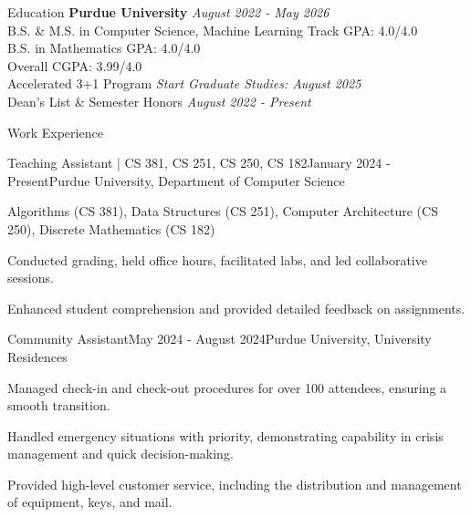 \documentclass[
    11pt, %
]{resume} %
\begin{document}
\small
\vspace*{-0.3cm}
\begin{rSection}{Education}
\vspace*{-0.3cm}
    \textbf{Purdue University} \hfill \textit{August 2022 - May 2026} \\
    B.S. \& M.S. in Computer Science, Machine Learning Track \hfill GPA: 4.0/4.0 \\
    B.S. in Mathematics \hfill GPA: 4.0/4.0 \\
    \hspace*{\fill}  Overall CGPA: 3.99/4.0 \\
    Accelerated 3+1 Program \hfill {\em Start Graduate Studies: August 2025} \\
    Dean's List \& Semester Honors \hfill {\em August 2022 - Present}

\end{rSection}

\vspace*{-0.3cm}
\begin{rSection}{Work Experience}
\vspace*{-0.2cm}
    \begin{rSubsection}{Teaching Assistant | CS 381, CS 251, CS 250, CS 182}{January 2024 - Present}{Purdue University, Department of Computer Science}{}
        \item Algorithms (CS 381), Data Structures (CS 251), Computer Architecture (CS 250), Discrete Mathematics (CS 182)
        \item Conducted grading, held office hours, facilitated labs, and led collaborative sessions.
        \item Enhanced student comprehension and provided detailed feedback on assignments.
    \end{rSubsection}
    \vspace*{0,3cm}
    
\begin{rSubsection}{Community Assistant}{May 2024 - August 2024}{Purdue University, University Residences}{}
    \item Managed check-in and check-out procedures for over 100 attendees, ensuring a smooth transition.
    \item Handled emergency situations with priority, demonstrating capability in crisis management and quick decision-making.
    \item Provided high-level customer service, including the distribution and management of equipment, keys, and mail.
\end{rSubsection}

\end{rSection}
\vspace*{-0.3cm}
\end{document}
